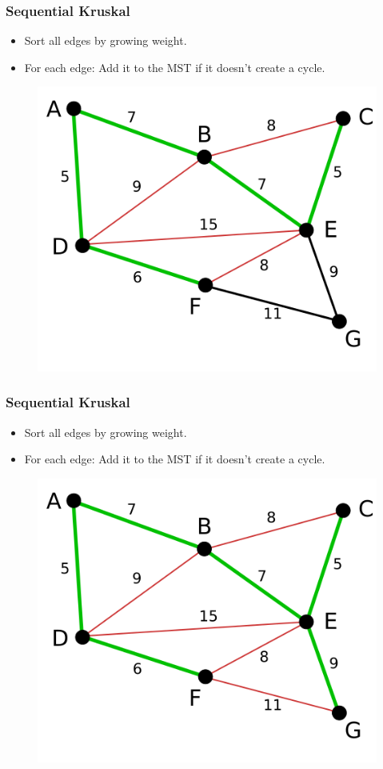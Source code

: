 \documentclass{beamer}
\begin{document}
\begin{frame}
    \frametitle{Sequential Kruskal}
    \begin{itemize}
        \item Sort all edges by growing weight.
        \item For each edge: Add it to the MST if it doesn't create a cycle.
    \end{itemize}

    \begin{figure}
        \includegraphics[width=.5\textwidth]{kruskal_5.png}
    \end{figure}

\end{frame}


\begin{frame}
    \frametitle{Sequential Kruskal}
    \begin{itemize}
        \item Sort all edges by growing weight.
        \item For each edge: Add it to the MST if it doesn't create a cycle.
    \end{itemize}

    \begin{figure}
        \includegraphics[width=.5\textwidth]{kruskal_6.png}
    \end{figure}

\end{frame}
\end{document}
